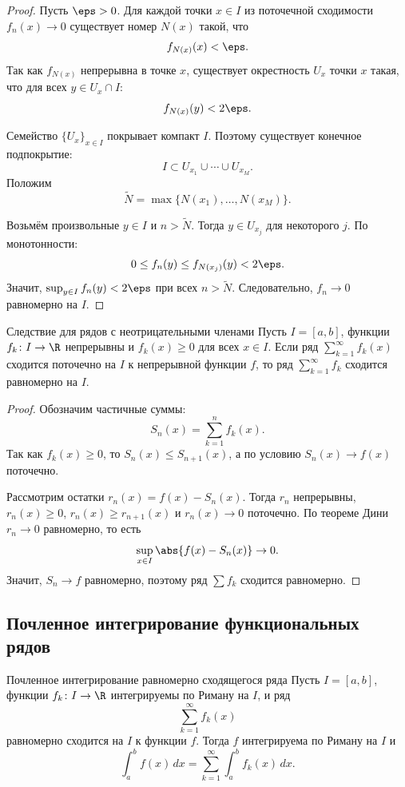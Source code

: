 \begin{proof}
	Пусть $\eps>0$. Для каждой точки $x\in I$ из поточечной сходимости $f_n(x)\to0$ существует номер $N(x)$ такой, что
	\[
	f_{N(x)}(x)<\eps.
	\]
	Так как $f_{N(x)}$ непрерывна в точке $x$, существует окрестность $U_x$ точки $x$ такая, что для всех $y\in U_x\cap I$:
	\[
	f_{N(x)}(y)<2\eps.
	\]
	
	Семейство $\{U_x\}_{x\in I}$ покрывает компакт $I$. Поэтому существует конечное подпокрытие:
	\[
	I\subset U_{x_1}\cup\cdots\cup U_{x_M}.
	\]
	Положим
	\[
	\widetilde N=\max\{N(x_1),\ldots,N(x_M)\}.
	\]
	
	Возьмём произвольные $y\in I$ и $n>\widetilde N$. Тогда $y\in U_{x_j}$ для некоторого $j$. По монотонности:
	\[
	0\le f_n(y)\le f_{N(x_j)}(y)<2\eps.
	\]
	Значит, $\sup_{y\in I}f_n(y)<2\eps$ при всех $n>\widetilde N$. Следовательно, $f_n\to0$ равномерно на $I$.
\end{proof}

\begin{Corollary}{Следствие для рядов с неотрицательными членами}{}
	Пусть $I=[a,b]$, функции $f_k\colon I\to\R$ непрерывны и $f_k(x)\ge0$ для всех $x\in I$. Если ряд $\sum_{k=1}^{\infty}f_k(x)$ сходится поточечно на $I$ к непрерывной функции $f$, то ряд $\sum_{k=1}^{\infty}f_k$ сходится равномерно на $I$.
\end{Corollary}

\begin{proof}
	Обозначим частичные суммы:
	\[
	S_n(x)=\sum_{k=1}^{n}f_k(x).
	\]
	Так как $f_k(x)\ge0$, то $S_n(x)\le S_{n+1}(x)$, а по условию $S_n(x)\to f(x)$ поточечно.
	
	Рассмотрим остатки $r_n(x)=f(x)-S_n(x)$. Тогда $r_n$ непрерывны, $r_n(x)\ge0$, $r_n(x)\ge r_{n+1}(x)$ и $r_n(x)\to0$ поточечно. По теореме Дини $r_n\to0$ равномерно, то есть
	\[
	\sup_{x\in I}\abs{f(x)-S_n(x)}\to0.
	\]
	Значит, $S_n\to f$ равномерно, поэтому ряд $\sum f_k$ сходится равномерно.
\end{proof}

\subsection{Почленное интегрирование функциональных рядов}

\begin{Theorem}{Почленное интегрирование равномерно сходящегося ряда}{}
	Пусть $I=[a,b]$, функции $f_k\colon I\to\R$ интегрируемы по Риману на $I$, и ряд
	\[
	\sum_{k=1}^{\infty} f_k(x)
	\]
	равномерно сходится на $I$ к функции $f$. Тогда $f$ интегрируема по Риману на $I$ и
	\[
	\int_a^b f(x)\,dx
	=
	\sum_{k=1}^{\infty}\int_a^b f_k(x)\,dx.
	\]
\end{Theorem}

